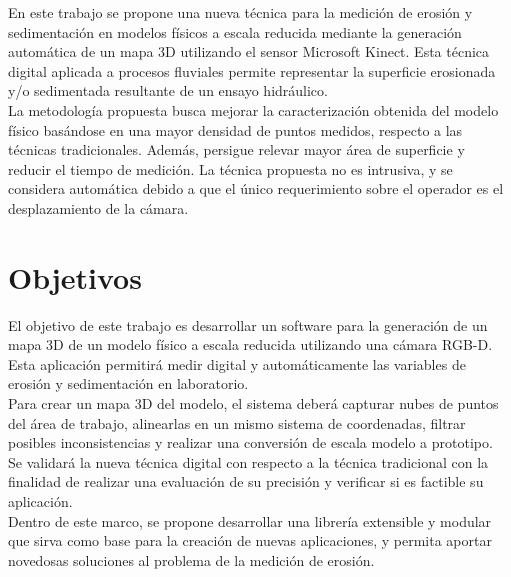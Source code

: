 En este trabajo se propone una nueva técnica para la medición de erosión y sedimentación en modelos físicos a escala reducida  mediante la generación automática de un mapa 3D utilizando el sensor Microsoft Kinect. Esta técnica digital aplicada a procesos fluviales permite representar la superficie erosionada y/o sedimentada resultante de un ensayo hidráulico. \\
La metodología propuesta busca mejorar la caracterización obtenida del modelo físico basándose en una mayor densidad de puntos medidos, respecto a las técnicas tradicionales. Además, persigue relevar mayor área de superficie y reducir el tiempo de medición. La técnica propuesta no es intrusiva, y se considera automática debido a que el único requerimiento sobre el operador es el desplazamiento de la cámara.

\section{Objetivos}
\label{S:objetivos}

El objetivo de este trabajo es desarrollar un software para la generación de un mapa 3D de un modelo físico a escala reducida utilizando una cámara RGB-D. Esta aplicación permitirá medir digital y automáticamente las variables de erosión y sedimentación en laboratorio. \\
Para crear un mapa 3D del modelo, el sistema deberá capturar nubes de puntos del área de trabajo, alinearlas en un mismo sistema de coordenadas, filtrar posibles inconsistencias y realizar una conversión de escala modelo a prototipo. \\
Se validará la nueva técnica digital con respecto a la técnica tradicional con la finalidad de realizar una evaluación de su precisión y verificar si es factible su aplicación. \\
Dentro de este marco, se propone desarrollar una librería extensible y modular que sirva como base para la creación de nuevas aplicaciones, y permita aportar novedosas soluciones al problema de la medición de erosión. \\

